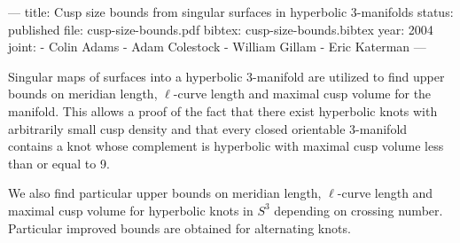 ---
title: Cusp size bounds from singular surfaces in hyperbolic 3-manifolds
status: published
file: cusp-size-bounds.pdf
bibtex: cusp-size-bounds.bibtex
year: 2004
joint:
  - Colin Adams
  - Adam Colestock
  - William Gillam
  - Eric Katerman
---

Singular maps of surfaces into a hyperbolic 3-manifold are utilized to find upper bounds on meridian length, $\ell$-curve length and maximal cusp volume for the manifold. This allows a proof of the fact that there exist hyperbolic knots with arbitrarily small cusp density and that every closed orientable 3-manifold contains a knot whose complement is hyperbolic with maximal cusp volume less than or equal to 9.

We also find particular upper bounds on meridian length, $\ell$-curve length and maximal cusp volume for hyperbolic knots in $S^3$ depending on crossing number. Particular improved bounds are obtained for alternating knots.
